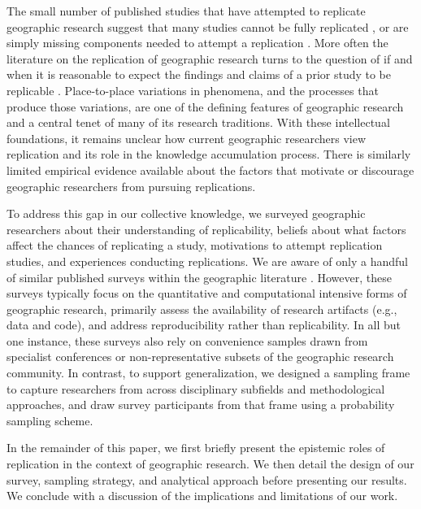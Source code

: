 \documentclass[]{interact}
\theoremstyle{plain}%
\theoremstyle{definition}
\theoremstyle{remark}
\begin{document}
The small number of published studies that have attempted to replicate geographic research suggest that many studies cannot be fully replicated \citep[e.g.,][]{Kedron2022dimaggio, paez2022reproducibility}, or are simply missing components needed to attempt a replication \citep{konkol2019, ostermann2017}.
More often the literature on the replication of geographic research turns to the question of if and when it is reasonable to expect the findings and claims of a prior study to be replicable \citep{kedron2021GA, kedron2022replication, goodchild2021replication, sui2021reproducibility}. 
Place-to-place variations in phenomena, and the processes that produce those variations, are one of the defining features of geographic research and a central tenet of many of its research traditions.
With these intellectual foundations, it remains unclear how current geographic researchers view replication and its role in the knowledge accumulation process.
There is similarly limited empirical evidence available about the factors that motivate or discourage geographic researchers from pursuing replications. 

To address this gap in our collective knowledge, we surveyed geographic researchers about their understanding of replicability, beliefs about what factors affect the chances of replicating a study, motivations to attempt replication studies, and experiences conducting replications.
We are aware of only a handful of similar published surveys within the geographic literature \citep{balz2020reproducibility, konkol2019, ostermann2017, kedron2023survey}.
However, these surveys typically focus on the quantitative and computational intensive forms of geographic research, primarily assess the availability of research artifacts (e.g., data and code), and address reproducibility rather than replicability. 
In all but one instance, these surveys also rely on convenience samples drawn from specialist conferences or non-representative subsets of the geographic research community. 
In contrast, to support generalization, we designed a sampling frame to capture researchers from across disciplinary subfields and methodological approaches, and draw survey participants from that frame using a probability sampling scheme.

In the remainder of this paper, we first briefly present the epistemic roles of replication in the context of geographic research.
We then detail the design of our survey, sampling strategy, and analytical approach before presenting our results. 
We conclude with a discussion of the implications and limitations of our work. 
\end{document}
